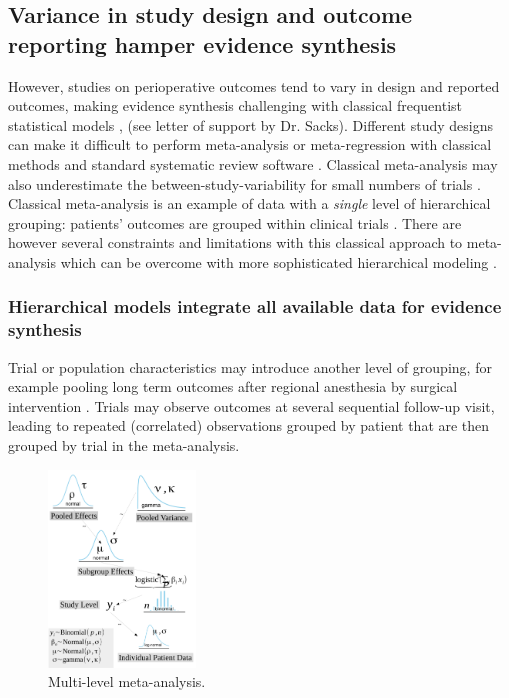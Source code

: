 \documentclass[11pt,notitlepage]{article}
\begin{document}
\subsection*{Variance in study design and outcome reporting hamper evidence synthesis}
However, studies on perioperative outcomes tend to vary in design and reported outcomes\cite{Andreae2013}, making 
evidence synthesis challenging with classical frequentist statistical models \cite{Spiegelhalter_11134920}, (see 
letter of support by Dr. Sacks). Different study designs can make it difficult to perform meta-analysis or meta-regression 
with classical methods and standard systematic review software \cite{Deeks2011chapter}. Classical meta-analysis may also 
underestimate the between-study-variability for small numbers of trials \cite{Song2012,Cornell2014,Andreae2015}. 
Classical meta-analysis is an example of data with a \textit{single} level of hierarchical grouping: patients' 
outcomes are grouped within clinical trials \cite{egger2008systematic}. There are however several constraints and limitations 
with this classical approach to meta-analysis which can be overcome with more sophisticated hierarchical modeling  
\cite{Andreae2015,Thompson2002,Abroug2011}.

\subsubsection*{Hierarchical models integrate all available data for evidence synthesis}



Trial or population characteristics may introduce another level of grouping, for example pooling long term outcomes 
after regional anesthesia by surgical intervention \cite{Andreae2013,Abroug2011}. Trials may observe outcomes at several 
sequential follow-up visit, leading to repeated (correlated) observations grouped by patient that are then grouped by trial 
in the meta-analysis.  

\begin{figure} 
 \vspace*{-14pt}
  \includegraphics[width=0.35\textwidth]{Figures/DistrogramMultiLevelMetaAnalysis.pdf} 
 \caption{Multi-level meta-analysis.}
 \vspace{-10pt}
 \label{fig:MetaAnalysis}
 \vspace*{-10pt}
\end{figure}
\end{document}
